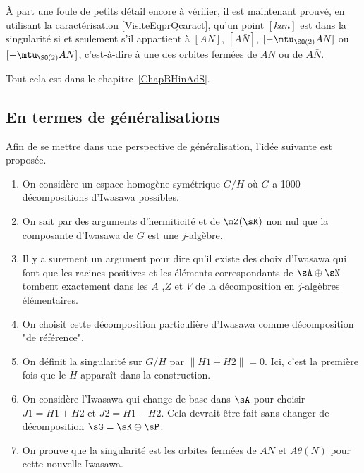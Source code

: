 À part une foule de petits détail encore à vérifier, il est maintenant prouvé, en utilisant la caractérisation \eqref{VisiteEqprQcaract}, qu'un point $[kan]$ est dans la singularité si et seulement s'il appartient à $[AN]$, $[A\bar N]$, $[-\mtu_{\SO(2)}AN]$ ou $[-\mtu_{\SO(2)}A\bar N]$, c'est-à-dire à une des orbites fermées de $AN$ ou de $A\bar N$.


Tout cela est dans le chapitre~\ref{ChapBHinAdS}.

\subsection{En termes de généralisations}

Afin de se mettre dans une perspective de généralisation, l'idée suivante est proposée.

\begin{enumerate}

	\item



	      On considère un espace homogène symétrique $G/H$ où $G$ a 1000 décompositions d'Iwasawa possibles.

	\item
	      On sait par des arguments d'hermiticité et de $\mZ(\sK)$ non nul que la composante d'Iwasawa de $G$ est une $j$-algèbre.

	\item
	      Il y a surement un argument pour dire qu'il existe des choix d'Iwasawa qui font que les racines positives et les éléments correspondants de $\sA\oplus\sN$ tombent exactement dans les $A$ ,$Z$ et $V $ de la décomposition en $j$-algèbres élémentaires.

	\item
	      On choisit cette décomposition particulière d'Iwasawa comme décomposition "de référence".

	\item
	      On définit la singularité sur $G/H$ par $\| H1+H2\|=0$. Ici, c'est la première fois que le $H$ apparaît dans la construction.

	\item
	      On considère l'Iwasawa qui change de base dans $\sA$ pour choisir $J1=H1+H2$ et $J2=H1-H2$. Cela devrait être fait sans changer de décomposition $\sG=\sK\oplus\sP$.

	\item		\label{ItemVGDern}
	      On prouve que la singularité est les orbites fermées de $AN$ et $A\theta(N)$ pour cette nouvelle Iwasawa.
\end{enumerate}


